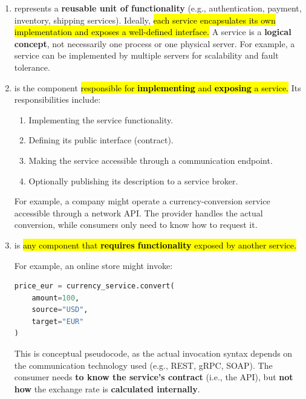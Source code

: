\begin{enumerate}[label={\Alph*.}]
    \item {} represents a \textbf{reusable unit of functionality} (e.g., authentication, payment, inventory, shipping services). Ideally, \hl{each service encapsulates its own implementation and exposes a well-defined interface.} A service is a \textbf{logical concept}, not necessarily one process or one physical server. For example, a service can be implemented by multiple servers for scalability and fault tolerance.

    \item {} is the component \hl{responsible for \textbf{implementing} and \textbf{exposing} a service.} Its responsibilities include:
        \begin{enumerate}
            \item Implementing the service functionality.
            \item Defining its public interface (contract).
            \item Making the service accessible through a communication endpoint.
            \item Optionally publishing its description to a service broker.
        \end{enumerate}
        \begin{examplebox}
            For example, a company might operate a currency-conversion service accessible through a network API. The provider handles the actual conversion, while consumers only need to know how to request it.
        \end{examplebox}

    \item {} is \hl{any component that \textbf{requires functionality} exposed by another service.}

        \begin{examplebox}
            For example, an online store might invoke:
\begin{lstlisting}[language=Python]
price_eur = currency_service.convert(
    amount=100,
    source="USD",
    target="EUR"
)
\end{lstlisting}
            This is conceptual pseudocode, as the actual invocation syntax depends on the communication technology used (e.g., REST, gRPC, SOAP). The consumer needs \textbf{to know the service's contract} (i.e., the API), but \textbf{not how} the exchange rate is \textbf{calculated internally}.
        \end{examplebox}


\end{enumerate}
